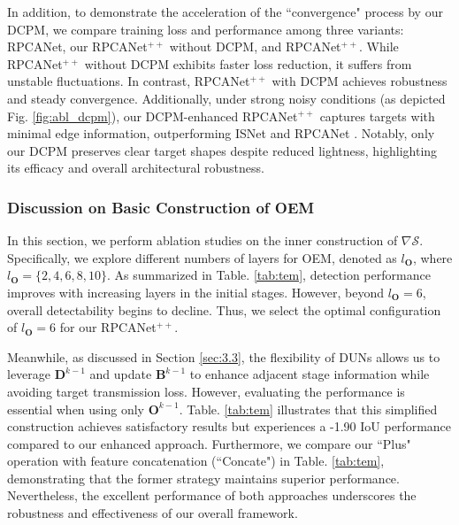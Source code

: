 \documentclass[10pt,journal,compsoc]{IEEEtran}
\begin{document}
In addition, to demonstrate the acceleration of the “convergence" process by our DCPM, we compare training loss and performance among three variants: RPCANet, our RPCANet$^{++}$ without DCPM, and RPCANet$^{++}$. While RPCANet$^{++}$ without DCPM exhibits faster loss reduction, it suffers from unstable fluctuations. In contrast, RPCANet$^{++}$ with DCPM achieves robustness and steady convergence. Additionally, under strong noisy conditions (as depicted Fig. \ref{fig:abl_dcpm}), our DCPM-enhanced RPCANet$^{++}$ captures targets with minimal edge information, outperforming ISNet \cite{zhang-2022-isnet} and RPCANet \cite{wu-2024-rpcanet}. Notably, only our DCPM preserves clear target shapes despite reduced lightness, highlighting its efficacy and overall architectural robustness.






\subsubsection{Discussion on Basic Construction of OEM}
In this section, we perform ablation studies on the inner construction of $\nabla\mathcal{S}$. Specifically, we explore different numbers of layers for OEM, denoted as $l_{\mathbf{O}}$, where $l_{\mathbf{O}}\!=\!\{2, 4, 6, 8, 10\}$. As summarized in Table. \ref{tab:tem}, detection performance improves with increasing layers in the initial stages. However, beyond $l_{\mathbf{O}}\!=\!6$, overall detectability begins to decline. Thus, we select the optimal configuration of $l_{\mathbf{O}}\!=\!6$ for our RPCANet$^{++}$.

Meanwhile, as discussed in Section \ref{sec:3.3}, the flexibility of DUNs allows us to leverage $\mathbf{D}^{k-1}$ and update $\mathbf{B}^{k-1}$ to enhance adjacent stage information while avoiding target transmission loss. However, evaluating the performance is essential when using only $\mathbf{O}^{k-1}$. Table. \ref{tab:tem} illustrates that this simplified construction achieves satisfactory results but experiences a -1.90 IoU performance compared to our enhanced approach. Furthermore, we compare our “Plus" operation with feature concatenation (“Concate") in Table. \ref{tab:tem}, demonstrating that the former strategy maintains superior performance. Nevertheless, the excellent performance of both approaches underscores the robustness and effectiveness of our overall framework.
\end{document}
